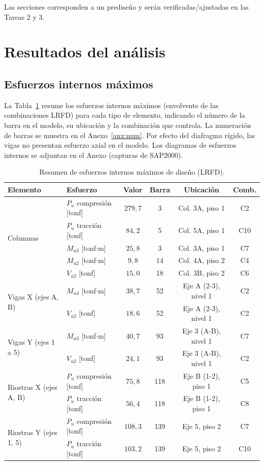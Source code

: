 \documentclass[11pt,letterpaper]{article}
\begin{document}
Las secciones corresponden a un prediseño y serán verificadas/ajustadas en las Tareas 2 y 3.

\section{Resultados del análisis}

\subsection{Esfuerzos internos máximos}
La Tabla~\ref{tab:esf} resume los esfuerzos internos máximos (envolvente de las combinaciones LRFD) para cada
tipo de elemento, indicando el número de la barra en el modelo, su ubicación y la combinación que controla.
La numeración de barras se muestra en el Anexo~\ref{anx:num}. Por efecto del diafragma rígido, las vigas no
presentan esfuerzo axial en el modelo. Los diagramas de esfuerzos internos se adjuntan en el Anexo (capturas de SAP2000).

\begin{table}[H]
\centering
\small
\caption{Resumen de esfuerzos internos máximos de diseño (LRFD).}
\label{tab:esf}
\begin{tabular}{llcccc}
\toprule
Elemento & Esfuerzo & Valor & Barra & Ubicación & Comb. \\
\midrule
\multirow{5}{*}{Columnas} & $P_u$ compresión [tonf] & $279{,}7$ & 3 & Col. 3A, piso 1 & C2 \\
 & $P_u$ tracción [tonf] & $84{,}2$ & 5 & Col. 5A, piso 1 & C10 \\
 & $M_{u3}$ [tonf$\cdot$m] & $25{,}8$ & 3 & Col. 3A, piso 1 & C7 \\
 & $M_{u2}$ [tonf$\cdot$m] & $9{,}8$ & 14 & Col. 4A, piso 2 & C4 \\
 & $V_{u2}$ [tonf] & $15{,}0$ & 18 & Col. 3B, piso 2 & C6 \\
\midrule
\multirow{2}{*}{Vigas X (ejes A, B)} & $M_{u3}$ [tonf$\cdot$m] & $38{,}7$ & 52 & Eje A (2-3), nivel 1 & C2 \\
 & $V_{u2}$ [tonf] & $18{,}6$ & 52 & Eje A (2-3), nivel 1 & C2 \\
\midrule
\multirow{2}{*}{Vigas Y (ejes 1 a 5)} & $M_{u3}$ [tonf$\cdot$m] & $40{,}7$ & 93 & Eje 3 (A-B), nivel 1 & C7 \\
 & $V_{u2}$ [tonf] & $24{,}1$ & 93 & Eje 3 (A-B), nivel 1 & C2 \\
\midrule
\multirow{2}{*}{Riostras X (ejes A, B)} & $P_u$ compresión [tonf] & $75{,}8$ & 118 & Eje B (1-2), piso 1 & C5 \\
 & $P_u$ tracción [tonf] & $56{,}4$ & 118 & Eje B (1-2), piso 1 & C8 \\
\midrule
\multirow{2}{*}{Riostras Y (ejes 1, 5)} & $P_u$ compresión [tonf] & $108{,}3$ & 139 & Eje 5, piso 2 & C7 \\
 & $P_u$ tracción [tonf] & $103{,}2$ & 139 & Eje 5, piso 2 & C10 \\
\bottomrule
\end{tabular}
\end{table}
\end{document}
